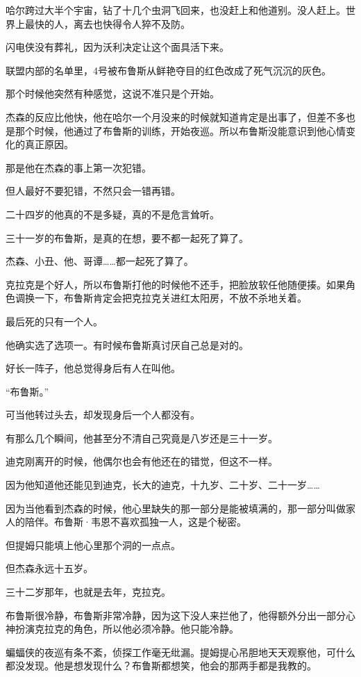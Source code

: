 \documentclass[../main]{subfiles}
\begin{document}
哈尔跨过大半个宇宙，钻了十几个虫洞飞回来，也没赶上和他道别。没人赶上。世界上最快的人，离去也快得令人猝不及防。

闪电侠没有葬礼，因为沃利决定让这个面具活下来。

联盟内部的名单里，4号被布鲁斯从鲜艳夺目的红色改成了死气沉沉的灰色。

那个时候他突然有种感觉，这说不准只是个开始。

杰森的反应比他快，他在哈尔一个月没来的时候就知道肯定是出事了，但差不多也是那个时候，他通过了布鲁斯的训练，开始夜巡。所以布鲁斯没能意识到他心情变化的真正原因。

那是他在杰森的事上第一次犯错。

但人最好不要犯错，不然只会一错再错。

二十四岁的他真的不是多疑，真的不是危言耸听。

三十一岁的布鲁斯，是真的在想，要不都一起死了算了。

杰森、小丑、他、哥谭……都一起死了算了。

克拉克是个好人，所以布鲁斯打他的时候他不还手，把脸放软任他随便揍。如果角色调换一下，布鲁斯肯定会把克拉克关进红太阳房，不放不杀地关着。

最后死的只有一个人。

他确实选了选项一。有时候布鲁斯真讨厌自己总是对的。

好长一阵子，他总觉得身后有人在叫他。

“布鲁斯。”

可当他转过头去，却发现身后一个人都没有。

有那么几个瞬间，他甚至分不清自己究竟是八岁还是三十一岁。

迪克刚离开的时候，他偶尔也会有他还在的错觉，但这不一样。

因为他知道他还能见到迪克，长大的迪克，十九岁、二十岁、二十一岁……

因为当他看到杰森的时候，他心里缺失的那一部分是能被填满的，那一部分叫做家人的陪伴。布鲁斯·韦恩不喜欢孤独一人，这是个秘密。

但提姆只能填上他心里那个洞的一点点。

但杰森永远十五岁。

三十二岁那年，也就是去年，克拉克。

布鲁斯很冷静，布鲁斯非常冷静，因为这下没人来拦他了，他得额外分出一部分心神扮演克拉克的角色，所以他必须冷静。他只能冷静。

蝙蝠侠的夜巡有条不紊，侦探工作毫无纰漏。提姆提心吊胆地天天观察他，可什么都没发现。他是想发现什么？布鲁斯都想笑，他会的那两手都是我教的。
\end{document}
